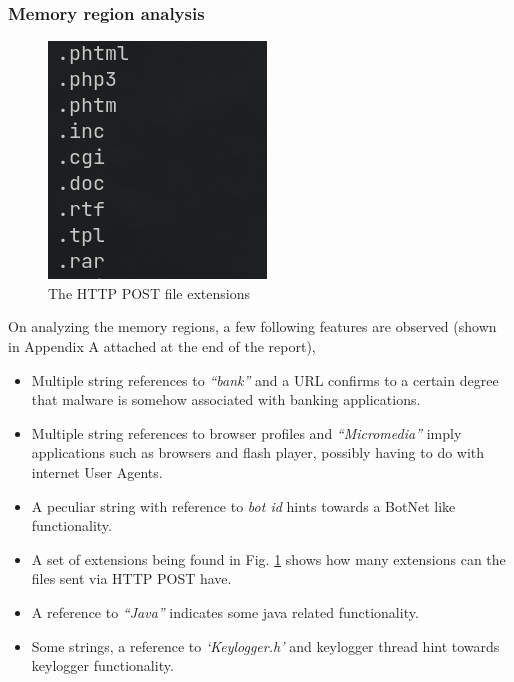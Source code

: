 \documentclass[10pt,a4paper]{article}
\begin{document}
				\subsubsection{Memory region analysis}
					\begin{figure}[!htbp]%
						\centering
						\includegraphics[width=\columnwidth]{pics/extns.png}
						\caption{The HTTP POST file extensions}
						\label{extns}
					\end{figure}
					On analyzing the memory regions, a few following features are observed (shown in Appendix A attached at the end of the report),
					\begin{itemize}
						\item Multiple string references to \textit{``bank''} and a URL confirms to a certain degree that malware is somehow associated with banking applications.
						\item Multiple string references to browser profiles and \textit{``Micromedia''} imply applications such as browsers and flash player, possibly having to do with internet User Agents.
						\item A peculiar string with reference to \textit{bot id} hints towards a BotNet like functionality.
						\item A set of extensions being found in Fig. \ref{extns} shows how many extensions can the files sent via HTTP POST have.
						\item A reference to \textit{``Java''} indicates some java related functionality.
						\item Some strings, a reference to \textit{`Keylogger.h'} and keylogger thread hint towards keylogger functionality.
					\end{itemize}
\end{document}
